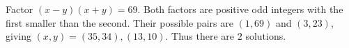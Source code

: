 Factor $(x-y)(x+y)=69$. Both factors are positive odd integers with the first smaller than the second. Their possible pairs are $(1,69)$ and $(3,23)$, giving $(x,y)=(35,34),(13,10)$. Thus there are $\boxed2$ solutions.

